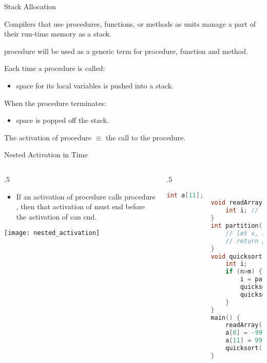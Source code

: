 \begin{bibunit}[apalike]
\begin{frame}{Stack Allocation}
	\begin{description}
	\item Compilers that use procedures, functions, or methods as units manage a part of their run-time memory as a stack.
	\item[Note] procedure will be used as a generic term for procedure, function and method.
	\vfill
	\item Each time a procedure is called:
		\begin{itemize}
		\item space for its local variables is pushed into a stack.
		\end{itemize}
	\item When the procedure terminates:
		\begin{itemize}
		\item space is popped off the stack.
		\end{itemize}
	\vfill
	\item The activation of procedure $\equiv$ the call to the procedure.
	\end{description}
\end{frame}

\begin{frame}[fragile]{Nested Activation in Time}
	\begin{small}
	\begin{columns}
		\begin{column}{.5\linewidth}
			\begin{itemize}
			\item If an activation of procedure  calls procedure , then that activation of  must end before the activation of  can end.
			\end{itemize}
			\texttt{[image: nested\_activation]}
		\end{column}
		\begin{column}{.5\linewidth}
			\begin{lstlisting}[language=C,basicstyle=\Tiny]
			int a[11];
			void readArray() {
			    int i; // read and fill a
			}
			int partition(int m, int n) {
			    // let v, a[m..p-1] < v, a[p]=v, a[p+1..n] >= v
			    // return p
			}
			void quicksort(int m, int n) {
			    int i;
			    if (n>m) {
			        i = partition(m,n);
			        quicksort(m,i-1);
			        quicksort(i+1,n);
			    }
			}
			main() {
			    readArray();
			    a[0] = -9999;
			    a[11] = 9999;
			    quicksort(1,9);
			}
			\end{lstlisting}
		\end{column}
	\end{columns}
	\end{small}
\end{frame}


\end{bibunit}
